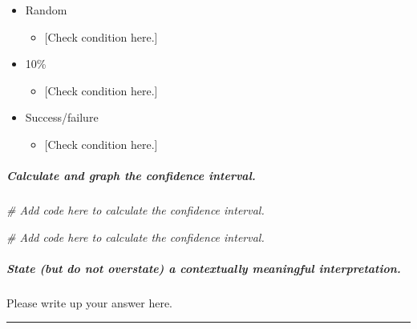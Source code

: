\documentclass[
]{book}
\newenvironment{Shaded}{\begin{snugshade}}{\end{snugshade}}
\newcommand{\CommentTok}[1]{\textcolor[rgb]{0.56,0.35,0.01}{\textit{#1}}}
\providecommand{\tightlist}{%
  \setlength{\itemsep}{0pt}\setlength{\parskip}{0pt}}
\begin{document}
\begin{itemize}
\tightlist
\item
  Random

  \begin{itemize}
  \tightlist
  \item
    {[}Check condition here.{]}
  \end{itemize}
\item
  10\%

  \begin{itemize}
  \tightlist
  \item
    {[}Check condition here.{]}
  \end{itemize}
\item
  Success/failure

  \begin{itemize}
  \tightlist
  \item
    {[}Check condition here.{]}
  \end{itemize}
\end{itemize}

\hypertarget{calculate-and-graph-the-confidence-interval.}{%
\subparagraph*{Calculate and graph the confidence interval.}\label{calculate-and-graph-the-confidence-interval.}}

\begin{Shaded}
\begin{Highlighting}[]
\CommentTok{\# Add code here to calculate the confidence interval.}
\end{Highlighting}
\end{Shaded}

\begin{Shaded}
\begin{Highlighting}[]
\CommentTok{\# Add code here to calculate the confidence interval.}
\end{Highlighting}
\end{Shaded}

\hypertarget{state-but-do-not-overstate-a-contextually-meaningful-interpretation.}{%
\subparagraph*{State (but do not overstate) a contextually meaningful interpretation.}\label{state-but-do-not-overstate-a-contextually-meaningful-interpretation.}}

Please write up your answer here.

\begin{center}\rule{0.5\linewidth}{0.5pt}\end{center}
\end{document}
